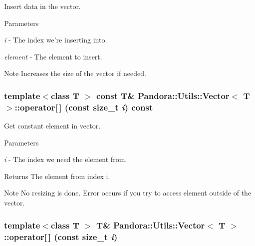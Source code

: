 Insert data in the vector. 
\begin{DoxyParams}{Parameters}
\item[{\em i}]-\/ The index we're inserting into. \item[{\em element}]-\/ The element to insert. \end{DoxyParams}
\begin{DoxyNote}{Note}
Increases the size of the vector if needed. 
\end{DoxyNote}
\hypertarget{classPandora_1_1Utils_1_1Vector_a36afe1f7fbe55eedfe0aa9a14ed75cfd}{
\subsubsection[{operator[]}]{\setlength{\rightskip}{0pt plus 5cm}template$<$class T $>$ const T\& {\bf Pandora::Utils::Vector}$<$ T $>$::operator\mbox{[}$\,$\mbox{]} (const size\_\-t {\em i}) const}}
\label{classPandora_1_1Utils_1_1Vector_a36afe1f7fbe55eedfe0aa9a14ed75cfd}


Get constant element in vector. 
\begin{DoxyParams}{Parameters}
\item[{\em i}]-\/ The index we need the element from. \end{DoxyParams}
\begin{DoxyReturn}{Returns}
The element from index i. 
\end{DoxyReturn}
\begin{DoxyNote}{Note}
No resizing is done. Error occurs if you try to access element outside of the vector. 
\end{DoxyNote}
\hypertarget{classPandora_1_1Utils_1_1Vector_a00d84e3e6da7b22d5324e47e903f9e93}{
\subsubsection[{operator[]}]{\setlength{\rightskip}{0pt plus 5cm}template$<$class T $>$ T\& {\bf Pandora::Utils::Vector}$<$ T $>$::operator\mbox{[}$\,$\mbox{]} (const size\_\-t {\em i})}}
\label{classPandora_1_1Utils_1_1Vector_a00d84e3e6da7b22d5324e47e903f9e93}


